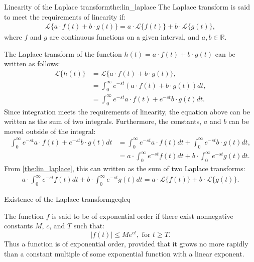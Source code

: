 \begin{theorem}{Linearity of the Laplace transform}{the:lin_laplace}
The Laplace transform is said to meet the requirements of linearity if:
\begin{align*}
\mathcal{L}\{a\cdot f(t)+b\cdot g(t)\}=a\cdot \mathcal{L}\{f(t)\}+b\cdot \mathcal{L}\{g(t)\},
\end{align*}
where $f$ and $g$ are continuous functions on a given interval, and $a, b \in \mathbb{R}$.
\end{theorem}
\begin{prof}{}{}
The Laplace transform of the function $h(t)=a\cdot f(t)+ b \cdot g(t)$ can be written as follows:
\begin{align*}
\mathcal{L}\{h(t)\}&=\mathcal{L}\{a\cdot f(t)+b\cdot g(t)\},
\\
&=\int_{0}^\infty e^{-st}\left(a\cdot f(t)+b\cdot g(t)\right)dt,
\\
&=\int_{0}^\infty e^{-st}a\cdot f(t)+e^{-st}b\cdot g(t)dt.
\end{align*}
Since integration meets the requirements of linearity, the equation above can be written as the sum of two integrals. Furthermore, the constants, $a$ and $b$ can be moved outside of the integral:
\begin{align*}
\int_{0}^\infty e^{-st}a\cdot f(t)+e^{-st}b\cdot g(t)dt &=\int_{0}^\infty e^{-st}a\cdot f(t)dt+\int_{0}^\infty e^{-st}b\cdot g(t)dt,
\\
&= a\cdot \int_{0}^\infty e^{-st} f(t)dt+ b \cdot \int_{0}^\infty e^{-st} g(t)dt.
\end{align*}
From \cref{the:lin_laplace}, this can written as the sum of two Laplace transforms:
\begin{align*}
a\cdot \int_{0}^\infty e^{-st} f(t)dt+ b \cdot \int_{0}^\infty e^{-st} g(t)dt =a\cdot \mathcal{L}\{f(t)\}+b\cdot \mathcal{L}\{g(t)\}.
\end{align*}
\end{prof}
\begin{theorem}{Existence of the Laplace transform}{geqleq}

The function $f$ is said to be of exponential order if there exist nonnegative constants $M$, $c$, and $T$  such that: $$|f(t)| \leq Me^{ct},    \text{   for } t \geq T.$$
Thus a function is of exponential order, provided that it grows no more rapidly than a constant multiple of some exponential function with a linear exponent. \cite[p.~320]{diffandcomplex}
\end{theorem}

